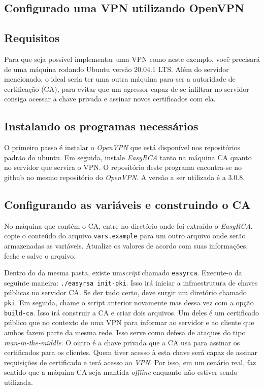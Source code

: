 \documentclass[12pt]{article}
\begin{document}
\begin{flushleft}
\section{Configurado uma VPN utilizando OpenVPN \cite{feilner2006openvpn}} 


\subsection{Requisitos}

Para que seja possível implementar uma VPN como neste exemplo, você precisará
de uma máquina rodando Ubuntu versão 20.04.1 LTS. Além do servidor mencionado,
o ideal seria ter uma outra máquina para ser a autoridade de certificação (CA), para evitar
que um agressor capaz de se infiltrar no servidor consiga acessar a chave privada
e assinar novos certificados com ela. 

\subsection{Instalando os programas necessários}

O primeiro passo é instalar o \emph{OpenVPN} que está disponível nos repositórios padrão do ubuntu.
Em seguida, instale \emph{EasyRCA} tanto na máquina CA quanto no servidor que servira o VPN.
O repositório deste programa encontra-se no github no mesmo repositório do \emph{OpenVPN}. 
A versão a ser utilizada é a 3.0.8. 

\subsection{Configurando as variáveis e construindo o CA}

No máquina que contém o CA, entre no diretório onde foi extraído o \emph{EasyRCA}. copie o conteúdo
do arquivo \texttt{vars.example} para um outro arquivo onde serão armazenadas as variáveis. Atualize
os valores de acordo com suas informações, feche e salve o arquivo. 

Dentro do da mesma pasta, existe um\emph{script} chamado \texttt{easyrca}. Execute-o da seguinte
maneira: \texttt{./easyrsa init-pki}. Isso irá iniciar a infraestrutura de chaves públicas no servidor CA.
Se der tudo certo, deve surgir um diretório chamado \texttt{pki}. Em seguida, chame o script anterior 
novamente mas dessa vez com a opção \texttt{build-ca}. Isso irá construir a CA e criar
dois arquivos. Um deles é um certificado público que no contexto de uma VPN para informar
ao servidor e ao cliente que ambos fazem parte da mesma rede. Isso serve como defesa de ataques 
do tipo \emph{man-in-the-middle}. O outro é a chave privada que a CA usa para assinar os certificados
para os clientes. Quem tiver acesso à esta chave será capaz de assinar requisições de certificado
e terá acesso ao \emph{VPN}. Por isso, em um cenário real, faz sentido que a máquina CA seja mantida \emph{offline}
enquanto não estiver sendo utilizada.


\end{flushleft}
\end{document}
